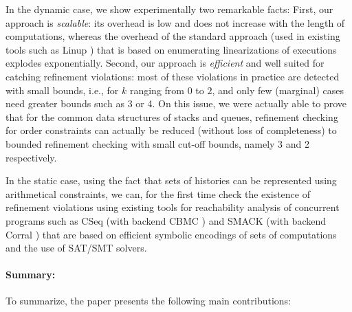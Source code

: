 In the dynamic case, we show experimentally two remarkable facts: First, our approach is {\em scalable}:  its overhead is low and does not increase with the length of computations, whereas the overhead of the standard approach (used in existing tools such as Linup \cite{}) that is based on enumerating linearizations of executions explodes exponentially. 
%
Second, our approach is {\em efficient} and well suited for catching refinement violations: most of these violations in practice are detected with small bounds, i.e., for $k$ ranging from 0 to $2$, and only few (marginal) cases need greater bounds such as 3 or 4. On this issue, we were actually able to prove that for  the common data structures of stacks and queues, refinement checking for order constraints can actually be reduced (without loss of completeness) to bounded refinement checking with small cut-off bounds, namely 3 and 2 respectively. 

In the static case, using the fact that sets of histories can be represented using arithmetical constraints, we can, for the first time check the existence of refinement violations using existing tools for reachability analysis of concurrent programs such as CSeq \cite{} (with backend CBMC \cite{}) and SMACK \cite{} (with backend Corral \cite{}) that are based on efficient symbolic encodings of sets of computations and the use of SAT/SMT solvers. %

\paragraph{Summary:}
To summarize, the paper presents the following main contributions:

